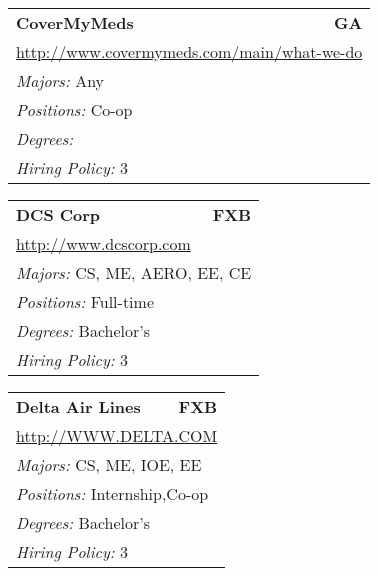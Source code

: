 \documentclass[twoside]{article}
\begin{document}
\begin{center}
\begin{multicols}{3}
\begin{FlushLeft}
\begin{minipage}{.9\columnwidth}
\end{minipage}
 
\begin{minipage}{.9\columnwidth}\begin{tabularx}{.95\columnwidth}{Xr}
                 {\Large\bf CoverMyMeds} & {\Large\bf GA}\\
    \multicolumn{2}{p{.95\columnwidth}}{\url{http://www.covermymeds.com/main/what-we-do}}\\
    \multicolumn{2}{p{.95\columnwidth}}{\emph{Majors:} Any}\\
    \multicolumn{2}{p{.95\columnwidth}}{\emph{Positions:} Co-op}\\
    \multicolumn{2}{p{.95\columnwidth}}{\emph{Degrees:} }\\
    \multicolumn{2}{p{.95\columnwidth}}{\emph{Hiring Policy:} 3}\\
    \end{tabularx}
    
\end{minipage}
 
\begin{minipage}{.9\columnwidth}\begin{tabularx}{.95\columnwidth}{Xr}
                 {\Large\bf DCS Corp} & {\Large\bf FXB}\\
    \multicolumn{2}{p{.95\columnwidth}}{\url{http://www.dcscorp.com}}\\
    \multicolumn{2}{p{.95\columnwidth}}{\emph{Majors:} CS, ME, AERO, EE, CE}\\
    \multicolumn{2}{p{.95\columnwidth}}{\emph{Positions:} Full-time}\\
    \multicolumn{2}{p{.95\columnwidth}}{\emph{Degrees:} Bachelor's}\\
    \multicolumn{2}{p{.95\columnwidth}}{\emph{Hiring Policy:} 3}\\
    \end{tabularx}
    
\end{minipage}
 
\begin{minipage}{.9\columnwidth}\begin{tabularx}{.95\columnwidth}{Xr}
                 {\Large\bf Delta Air Lines} & {\Large\bf FXB}\\
    \multicolumn{2}{p{.95\columnwidth}}{\url{http://WWW.DELTA.COM}}\\
    \multicolumn{2}{p{.95\columnwidth}}{\emph{Majors:} CS, ME, IOE, EE}\\
    \multicolumn{2}{p{.95\columnwidth}}{\emph{Positions:} Internship,Co-op}\\
    \multicolumn{2}{p{.95\columnwidth}}{\emph{Degrees:} Bachelor's}\\
    \multicolumn{2}{p{.95\columnwidth}}{\emph{Hiring Policy:} 3}\\
    \end{tabularx}
    

\end{minipage}
\end{FlushLeft}
\end{multicols}
\end{center}
\end{document}

